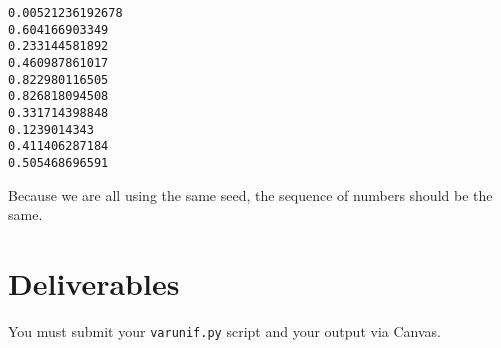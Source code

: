 \begin{fullwidth}
\begin{verbatim}
0.00521236192678
0.604166903349
0.233144581892
0.460987861017
0.822980116505
0.826818094508
0.331714398848
0.1239014343
0.411406287184
0.505468696591
\end{verbatim}

Because we are all using the same seed, the sequence of numbers should be the same.

\section{Deliverables}

You must submit your {\tt varunif.py} script and your output via Canvas.

\end{fullwidth}
